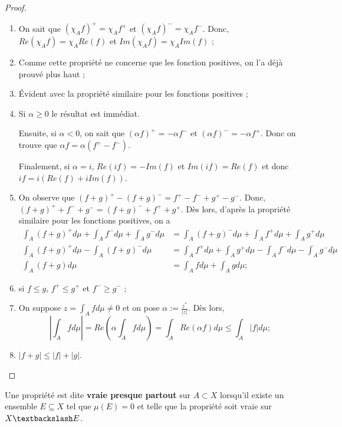     \begin{proof}
        \begin{enumerate}[label=(\roman*)]
        \item On sait que $(\chi_Af)^+=\chi_Af^+$ et $(\chi_Af)^-=\chi_Af^-$. Donc, $Re(\chi_Af)=\chi_A Re(f)$ et $Im(\chi_Af)=\chi_AIm(f)$ ;
        \item Comme cette propriété ne concerne que les fonction positives, on l'a déjà prouvé plus haut ;
        \item Évident avec la propriété similaire pour les fonctions positives ;
        \item Si $\alpha\geq0$ le résultat est immédiat.
        
        Ensuite, si $\alpha<0$, on sait que $(\alpha f)^+=-\alpha f^-$ et $(\alpha f)^-=-\alpha f^+$. Donc on trouve que $\alpha f = \alpha(f^+-f^-)$.
        
        Finalement, si $\alpha = i$, $Re(if)=-Im(f)$ et $Im(if)=Re(f)$ et donc $if=i(Re(f)+iIm(f))$.
        \item On observe que $(f+g)^+-(f+g)^-=f^+-f^-+g^+-g^-$. Donc, $(f+g)^++f^-+g^- = (f+g)^-+f^++g^+$. Dès lors, d'après la propriété similaire pour les fonctions positives, on a
        \begin{align*}
            \int_A(f+g)^+d\mu+\int_Af^-d\mu+\int_Ag^-d\mu &= \int_A(f+g)^-d\mu+\int_Af^+d\mu+\int_Ag^+d\mu\\
            \int_A(f+g)^+d\mu - \int_A(f+g)^-d\mu &= \int_Af^+d\mu+\int_Ag^+d\mu-\int_Af^-d\mu-\int_Ag^-d\mu\\
            \int_A(f+g)d\mu &= \int_Afd\mu+\int_Agd\mu ;
        \end{align*}
        \item si $f\leq g$, $f^+\leq g^+$ et $f^-\geq g^-$ ;
        \item On suppose $z=\int_A fd\mu\neq0$ et on pose $\alpha:=\frac{z^*}{|z|}$. Dès lors,
        \begin{equation*}
            \left|\int_Afd\mu\right| = Re(\alpha\int_Afd\mu)=\int_ARe(\alpha f)d\mu\leq\int_A|f|d\mu ;
        \end{equation*}
        \item $|f+g|\leq|f|+|g|$.
    \end{enumerate}
\end{proof}

\begin{definition}
    Une propriété est dite \textbf{vraie presque partout} sur $A\subset X$ lorsqu'il existe un ensemble $E\subseteq X$ tel que $\mu(E)=0$ et telle que la propriété soit vraie sur $X\textbackslash E$.
\end{definition}

